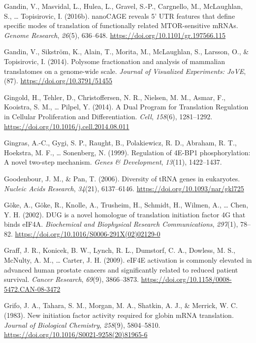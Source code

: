 \documentclass[12pt,openany]{book}
\begin{document}
\hypertarget{ref-Gandin2016a}{}
Gandin, V., Masvidal, L., Hulea, L., Gravel, S.-P., Cargnello, M.,
McLaughlan, S., \ldots{} Topisirovic, I. (2016b). nanoCAGE reveals 5'
UTR features that define specific modes of translation of functionally
related MTOR-sensitive mRNAs. \emph{Genome Research}, \emph{26}(5),
636--648. \url{https://doi.org/10.1101/gr.197566.115}

\hypertarget{ref-Gandin2014}{}
Gandin, V., Sikström, K., Alain, T., Morita, M., McLaughlan, S.,
Larsson, O., \& Topisirovic, I. (2014). Polysome fractionation and
analysis of mammalian translatomes on a genome-wide scale. \emph{Journal
of Visualized Experiments: JoVE}, (87).
\url{https://doi.org/10.3791/51455}

\hypertarget{ref-Gingold2014}{}
Gingold, H., Tehler, D., Christoffersen, N. R., Nielsen, M. M., Asmar,
F., Kooistra, S. M., \ldots{} Pilpel, Y. (2014). A Dual Program for
Translation Regulation in Cellular Proliferation and Differentiation.
\emph{Cell}, \emph{158}(6), 1281--1292.
\url{https://doi.org/10.1016/j.cell.2014.08.011}

\hypertarget{ref-Gingras1999}{}
Gingras, A.-C., Gygi, S. P., Raught, B., Polakiewicz, R. D., Abraham, R.
T., Hoekstra, M. F., \ldots{} Sonenberg, N. (1999). Regulation of 4E-BP1
phosphorylation: A novel two-step mechanism. \emph{Genes \&
Development}, \emph{13}(11), 1422--1437.

\hypertarget{ref-Goodenbour2006}{}
Goodenbour, J. M., \& Pan, T. (2006). Diversity of tRNA genes in
eukaryotes. \emph{Nucleic Acids Research}, \emph{34}(21), 6137--6146.
\url{https://doi.org/10.1093/nar/gkl725}

\hypertarget{ref-Goke2002}{}
Göke, A., Göke, R., Knolle, A., Trusheim, H., Schmidt, H., Wilmen, A.,
\ldots{} Chen, Y. H. (2002). DUG is a novel homologue of translation
initiation factor 4G that binds eIF4A. \emph{Biochemical and Biophysical
Research Communications}, \emph{297}(1), 78--82.
\url{https://doi.org/10.1016/S0006-291X(02)02129-0}

\hypertarget{ref-Graff2009}{}
Graff, J. R., Konicek, B. W., Lynch, R. L., Dumstorf, C. A., Dowless, M.
S., McNulty, A. M., \ldots{} Carter, J. H. (2009). eIF4E activation is
commonly elevated in advanced human prostate cancers and significantly
related to reduced patient survival. \emph{Cancer Research},
\emph{69}(9), 3866--3873.
\url{https://doi.org/10.1158/0008-5472.CAN-08-3472}

\hypertarget{ref-Grifo1983}{}
Grifo, J. A., Tahara, S. M., Morgan, M. A., Shatkin, A. J., \& Merrick,
W. C. (1983). New initiation factor activity required for globin mRNA
translation. \emph{Journal of Biological Chemistry}, \emph{258}(9),
5804--5810. \url{https://doi.org/10.1016/S0021-9258(20)81965-6}
\end{document}
